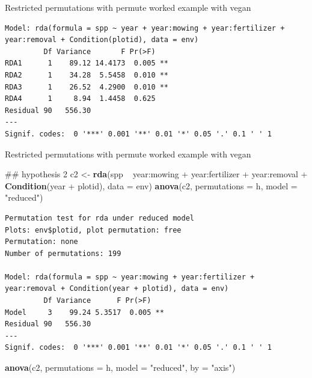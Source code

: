 \documentclass[10pt,ignorenonframetext,compress, aspectratio=169]{beamer}
\newenvironment{Shaded}{\begin{snugshade}}{\end{snugshade}}
\newcommand{\KeywordTok}[1]{\textcolor[rgb]{0.13,0.29,0.53}{\textbf{{#1}}}}
\newcommand{\DataTypeTok}[1]{\textcolor[rgb]{0.13,0.29,0.53}{{#1}}}
\newcommand{\StringTok}[1]{\textcolor[rgb]{0.31,0.60,0.02}{{#1}}}
\newcommand{\NormalTok}[1]{{#1}}
\begin{document}
\begin{frame}[fragile]{Restricted permutations with permute \textbar{}
worked example with vegan}
\begin{verbatim}
Model: rda(formula = spp ~ year + year:mowing + year:fertilizer + year:removal + Condition(plotid), data = env)
         Df Variance       F Pr(>F)   
RDA1      1    89.12 14.4173  0.005 **
RDA2      1    34.28  5.5458  0.010 **
RDA3      1    26.52  4.2900  0.010 **
RDA4      1     8.94  1.4458  0.625   
Residual 90   556.30                  
---
Signif. codes:  0 '***' 0.001 '**' 0.01 '*' 0.05 '.' 0.1 ' ' 1
\end{verbatim}

\normalsize

\end{frame}

\begin{frame}[fragile]{Restricted permutations with permute \textbar{}
worked example with vegan}

\tiny

\begin{Shaded}
\begin{Highlighting}[]
\NormalTok{## hypothesis 2}
\NormalTok{c2 <-}\StringTok{ }\KeywordTok{rda}\NormalTok{(spp ~}\StringTok{ }\NormalTok{year:mowing +}\StringTok{ }\NormalTok{year:fertilizer +}\StringTok{ }\NormalTok{year:removal +}
\StringTok{          }\KeywordTok{Condition}\NormalTok{(year +}\StringTok{ }\NormalTok{plotid), }\DataTypeTok{data =} \NormalTok{env)}
\KeywordTok{anova}\NormalTok{(c2, }\DataTypeTok{permutations =} \NormalTok{h, }\DataTypeTok{model =} \StringTok{"reduced"}\NormalTok{)}
\end{Highlighting}
\end{Shaded}

\begin{verbatim}
Permutation test for rda under reduced model
Plots: env$plotid, plot permutation: free
Permutation: none
Number of permutations: 199

Model: rda(formula = spp ~ year:mowing + year:fertilizer + year:removal + Condition(year + plotid), data = env)
         Df Variance      F Pr(>F)   
Model     3    99.24 5.3517  0.005 **
Residual 90   556.30                 
---
Signif. codes:  0 '***' 0.001 '**' 0.01 '*' 0.05 '.' 0.1 ' ' 1
\end{verbatim}

\begin{Shaded}
\begin{Highlighting}[]
\KeywordTok{anova}\NormalTok{(c2, }\DataTypeTok{permutations =} \NormalTok{h, }\DataTypeTok{model =} \StringTok{"reduced"}\NormalTok{, }\DataTypeTok{by =} \StringTok{"axis"}\NormalTok{)}
\end{Highlighting}
\end{Shaded}


\end{frame}
\end{document}
